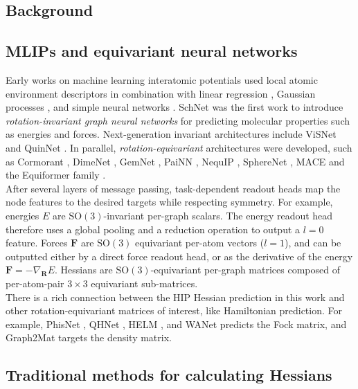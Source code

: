 \documentclass[pdflatex,sn-mathphys-num]{sn-jnl}%
\theoremstyle{thmstyleone}%
\theoremstyle{thmstyletwo}%
\theoremstyle{thmstylethree}%
\begin{document}
\begin{appendices}

\section{Background}
\subsection{MLIPs and equivariant neural networks}
Early works on machine learning interatomic potentials used local atomic environment descriptors in combination with linear regression \citep{thompson2015,shapeev2016}, Gaussian processes \citep{bartok2010}, and simple neural networks \citep{behler2007}.
SchNet \citep{schutt2018} was the first work to introduce \textit{rotation-invariant graph neural networks} for predicting molecular properties such as energies and forces. Next-generation invariant architectures include ViSNet \citep{wang2022} and QuinNet \citep{wang2024}.
In parallel, \textit{rotation-equivariant} architectures were developed, such as Cormorant \citep{anderson2019}, DimeNet \citep{gasteiger2020}, GemNet \citep{gasteiger2021}, PaiNN \citep{schutt2021}, NequIP \citep{batzner2022}, SphereNet \citep{liu2022}, MACE \citep{batatia2022} and the Equiformer family \citep{liao2023, liao2023equiformerv2, burger2025dequify}. \\
After several layers of message passing, task-dependent readout heads map the node features to the desired targets while respecting symmetry. For example, energies $E$ are $\mathrm{SO}(3)$-invariant per-graph scalars. The energy readout head therefore uses a global pooling and a reduction operation to output a $l{=}0$ feature. Forces $\mathbf{F}$ are $\mathrm{SO}(3)$ equivariant per-atom vectors ($l=1$), and can be outputted either by a direct force readout head, or as the derivative of the energy $\mathbf{F} = -\nabla_\mathbf{R} E$. Hessians are $\mathrm{SO}(3)$-equivariant per-graph matrices composed of per-atom-pair $3\times3$ equivariant sub-matrices. \\
There is a rich connection between the HIP Hessian prediction in this work and other rotation-equivariant matrices of interest, like Hamiltonian prediction. For example, PhisNet \cite{unke2021se}, QHNet \cite{yu2023efficient}, HELM \cite{Kaniselvan2025helm}, and WANet \cite{li2025enhancing} predicts the Fock matrix, and Graph2Mat \cite{febrer2025graph2mat} targets the density matrix.
% 
\subsection{Traditional methods for calculating Hessians}

\end{appendices}
\end{document}
